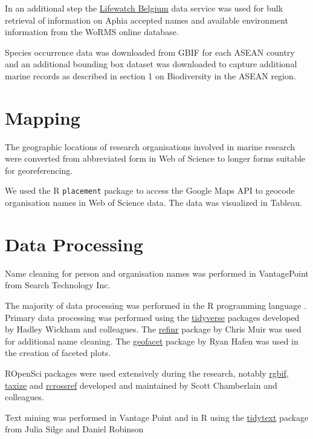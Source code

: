 \documentclass[openany]{book}
\theoremstyle{definition}
\theoremstyle{definition}
\theoremstyle{definition}
\theoremstyle{remark}
\begin{document}
In an additional step the
\href{http://www.lifewatch.be/data-services/?cache=1521050271}{Lifewatch
Belgium} data service was used for bulk retrieval of information on
Aphia accepted names and available environment information from the
WoRMS online database.

Species occurrence data was downloaded from GBIF for each ASEAN country
and an additional bounding box dataset was downloaded to capture
additional marine records as described in section 1 on Biodiversity in
the ASEAN region.

\hypertarget{mapping}{%
\section{Mapping}\label{mapping}}

The geographic locations of research organisations involved in marine
research were converted from abbreviated form in Web of Science to
longer forms suitable for georeferencing.

We used the R \texttt{placement} package to access the Google Maps API
to geocode organisation names in Web of Science data. The data was
visualized in Tableau.

\hypertarget{data-processing}{%
\section{Data Processing}\label{data-processing}}

Name cleaning for person and organisation names was performed in
VantagePoint from Search Technology Inc.

The majority of data processing was performed in the R programming
language \citep{r_core}. Primary data processing was performed using the
\href{https://github.com/tidyverse/tidyverse}{tidyverse} packages
developed by Hadley Wickham and colleagues. The
\href{https://github.com/ChrisMuir/refinr}{refinr} package by Chris Muir
was used for additional name cleaning. The
\href{https://github.com/hafen/geofacet}{geofacet} package by Ryan Hafen
was used in the creation of faceted plots.

ROpenSci packages were used extensively during the research, notably
\href{https://github.com/ropensci/rgbif}{rgbif},
\href{https://github.com/ropensci/taxize}{taxize} and
\href{https://github.com/ropensci/rcrossref}{rcrossref} developed and
maintained by Scott Chamberlain and colleagues.

Text mining was performed in Vantage Point and in R using the
\href{https://github.com/juliasilge/tidytext}{tidytext} package from
Julia Silge and Daniel Robinson \citep{Fay_2018}
\end{document}
